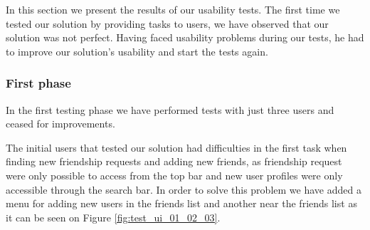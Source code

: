 In this section we present the results of our usability tests. The first time we tested our solution by providing tasks to users, we have observed that our solution was not perfect. Having faced usability problems during our tests, he had to improve our solution's usability and start the tests again.

  \subsubsection {First phase}

In the first testing phase we have performed tests with just three users and ceased for improvements. 

The initial users that tested our solution had difficulties in the first task when finding new friendship requests and adding new friends, as friendship request were only possible to access from the top bar and new user profiles were only accessible through the search bar. In order to solve this problem we have added a menu for adding new users in the friends list and another near the friends list as it can be seen on Figure \ref{fig:test_ui_01_02_03}.

